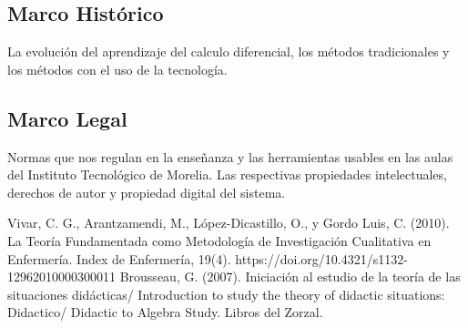 \documentclass{article}
\begin{document}
\subsection{Marco Histórico}
La evolución del aprendizaje del calculo diferencial, los métodos tradicionales y los métodos con el uso de la tecnología.

\subsection{Marco Legal}
Normas que nos regulan en la enseñanza y las herramientas usables en las aulas del Instituto Tecnológico de Morelia. Las respectivas propiedades intelectuales, derechos de autor y propiedad digital del sistema.



\begin{thebibliography}{99}
   Vivar, C. G., Arantzamendi, M., López-Dicastillo, O., y Gordo Luis, C. (2010). La Teoría Fundamentada como Metodología de Investigación Cualitativa en Enfermería. Index de Enfermería, 19(4). https://doi.org/10.4321/s1132-12962010000300011
   Brousseau, G. (2007). Iniciación al estudio de la teoría de las situaciones didácticas/ Introduction to study the theory of didactic situations: Didactico/ Didactic to Algebra Study. Libros del Zorzal.

\end{thebibliography}
\end{document}
